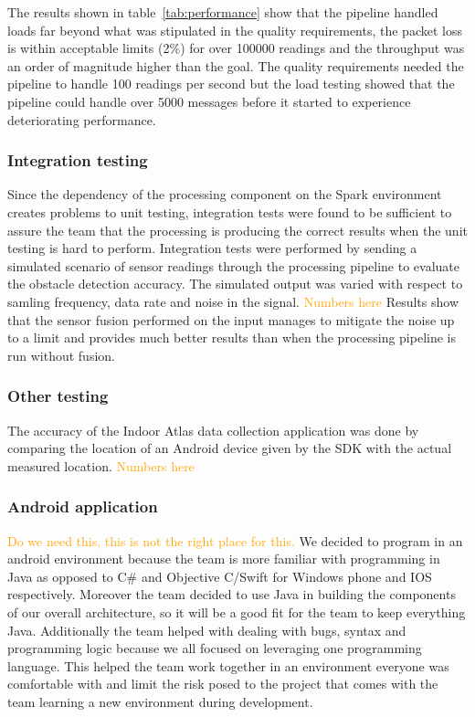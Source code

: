 \documentclass[prodmode,acmtosem]{acmsmall} %
\begin{document}
The results shown in table~\ref{tab:performance} show that the pipeline handled loads far beyond what was stipulated in the quality requirements, the packet loss is within acceptable limits (2\%) for over 100000 readings and the throughput was an order of magnitude higher than the goal. The quality requirements needed the pipeline to handle 100 readings per second but the load testing showed that the pipeline could handle over 5000 messages before it started to experience deteriorating performance.

\subsubsection{Integration testing}
Since the dependency of the processing component on the Spark environment creates  problems to unit testing, integration tests were found to be sufficient to assure the team that the processing is producing the correct results when the unit testing is hard to perform. Integration tests were performed by sending a simulated scenario of sensor readings through the processing pipeline to evaluate the obstacle detection accuracy. The simulated output was varied with respect to samling frequency, data rate and noise in the signal.
\textcolor{orange}{Numbers here}
Results show that the sensor fusion performed on the input manages to mitigate the noise up to a limit and provides much better results than when the processing pipeline is run without fusion.

\subsubsection{Other testing}
The accuracy of the Indoor Atlas data collection application was done by comparing the location of an Android device given by the SDK with the actual measured location.
\textcolor{orange}{Numbers here}

\subsubsection{Android application}
\textcolor{orange}{Do we need this, this is not the right place for this.}
We decided to program in an android environment because the team is more familiar with programming in Java as opposed to C\# and Objective C/Swift for Windows phone and IOS respectively. Moreover the team decided to use Java in building the components of our overall architecture, so it will be a good fit for the team to keep everything Java. Additionally the team helped with dealing with bugs, syntax and programming logic because we all focused on leveraging one programming language. This helped the team work together in an environment everyone was comfortable with and limit the risk posed to the project that comes with the team learning a new environment during development.
\end{document}
